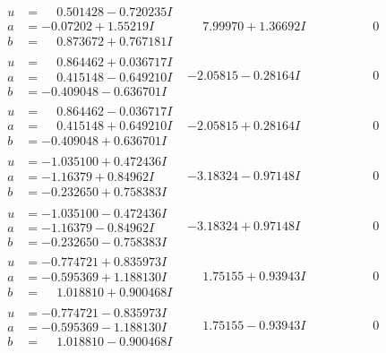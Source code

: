\documentclass[1p]{elsarticle_modified}
\theoremstyle{definition}
\begin{document}
$$\begin{array}{c|c|c}
\begin{aligned}
u &= \phantom{-}0.501428 - 0.720235 I \\
a &= -0.07202 + 1.55219 I \\
b &= \phantom{-}0.873672 + 0.767181 I\end{aligned}
 & \phantom{-}7.99970 + 1.36692 I & \phantom{-0.000000 } 0 \\ \hline\begin{aligned}
u &= \phantom{-}0.864462 + 0.036717 I \\
a &= \phantom{-}0.415148 - 0.649210 I \\
b &= -0.409048 - 0.636701 I\end{aligned}
 & -2.05815 - 0.28164 I & \phantom{-0.000000 } 0 \\ \hline\begin{aligned}
u &= \phantom{-}0.864462 - 0.036717 I \\
a &= \phantom{-}0.415148 + 0.649210 I \\
b &= -0.409048 + 0.636701 I\end{aligned}
 & -2.05815 + 0.28164 I & \phantom{-0.000000 } 0 \\ \hline\begin{aligned}
u &= -1.035100 + 0.472436 I \\
a &= -1.16379 + 0.84962 I \\
b &= -0.232650 + 0.758383 I\end{aligned}
 & -3.18324 - 0.97148 I & \phantom{-0.000000 } 0 \\ \hline\begin{aligned}
u &= -1.035100 - 0.472436 I \\
a &= -1.16379 - 0.84962 I \\
b &= -0.232650 - 0.758383 I\end{aligned}
 & -3.18324 + 0.97148 I & \phantom{-0.000000 } 0 \\ \hline\begin{aligned}
u &= -0.774721 + 0.835973 I \\
a &= -0.595369 + 1.188130 I \\
b &= \phantom{-}1.018810 + 0.900468 I\end{aligned}
 & \phantom{-}1.75155 + 0.93943 I & \phantom{-0.000000 } 0 \\ \hline\begin{aligned}
u &= -0.774721 - 0.835973 I \\
a &= -0.595369 - 1.188130 I \\
b &= \phantom{-}1.018810 - 0.900468 I\end{aligned}
 & \phantom{-}1.75155 - 0.93943 I & \phantom{-0.000000 } 0 \\ \hline\begin{aligned}

\end{aligned}
\end{array}$$
\end{document}
